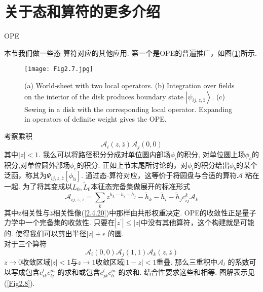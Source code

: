 \section{关于态和算符的更多介绍}%

\centerline{\Large OPE}
本节我们做一些态-算符对应的其他应用. 第一个是OPE的普遍推广，如图(\ref{Fig2.7})所示.
\begin{figure}
	\begin{center}
		\texttt{[image: Fig2.7.jpg]}\\
\caption{(a) World-sheet with two local operators. (b) Integration over fields on the interior of the disk produces boundary state $\left|\psi_{i j, z, \bar{z}}\right\rangle$. (c) Sewing in a disk with the corresponding local operator. Expanding in operators of definite weight gives the OPE.}\label{Fig2.7}
	\end{center}
\end{figure}
考察乘积
\begin{equation}
\mathscr{A}_{i}(z, \bar{z}) \mathscr{A}_{j}(0,0)
\end{equation}
其中$|z|<1$. 我么可以将路径积分分成对单位圆内部场$\phi_i$的积分, 对单位圆上场$\phi_b$的积分,对单位圆外部场$\phi_e$的积分. 正如上节末尾所讨论的，对$\phi_i$的积分给出$\phi_b$的某个泛函，称其为$\Psi_{i j, z, \bar{z}}\left[\phi_{\mathrm{b}}\right]$. 通过态-算符对应，这等价于将圆盘与合适的算符$\mathscr{A}$ 粘在一起. 为了将其变成以$L_{0}, \tilde{L}_{0}$本征态完备集做展开的标准形式
\begin{equation}
\mathscr{A}_{i j, z, \bar{z}}=\sum_{k} z^{h_{k}-h_{i}-h_{j}}-\tilde{h}_{k}-\tilde{h}_{i}-\tilde{h}_{j} c_{i j}^{k} \mathscr{A}_{k}
\end{equation}
其中z相关性与$\bar{z}$相关性像(\ref{2.4.20})中那样由共形权重决定. OPE的收敛性正是量子力学中一个完备集的收敛性. 只要在$\left|z^{\prime}\right| \leq|z|$中没有其他算符，这个构建就是可能的. 使得我们可以剪出半径$|z|+\epsilon$ 的圆.\\
对于三个算符
\begin{equation}
\mathscr{A}_{i}(0,0) \mathscr{A}_{j}(1,1) \mathscr{A}_{k}(z, \bar{z})
\end{equation}
$z\to 0$收敛区域$|z|<1$与$z\to 1$收敛区域$|1-z|<1$重叠. 那么三重积中$\mathscr{A}_l$ 的系数可以写成包含$c_{i k}^{l} c^{m} _{l j}$ 的求和或包含$c_{j k}^{l} c^{m} _{li}$ 的求和. 结合性要求这些和相等. 图解表示见(\ref{Fig2.8}).

